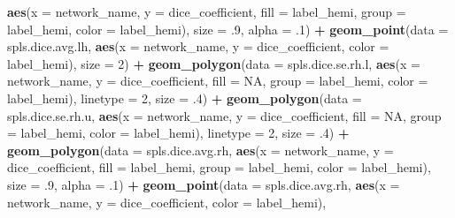 \documentclass[
]{article}
\newenvironment{Shaded}{\begin{snugshade}}{\end{snugshade}}
\newcommand{\DataTypeTok}[1]{\textcolor[rgb]{0.13,0.29,0.53}{#1}}
\newcommand{\DecValTok}[1]{\textcolor[rgb]{0.00,0.00,0.81}{#1}}
\newcommand{\FloatTok}[1]{\textcolor[rgb]{0.00,0.00,0.81}{#1}}
\newcommand{\KeywordTok}[1]{\textcolor[rgb]{0.13,0.29,0.53}{\textbf{#1}}}
\newcommand{\NormalTok}[1]{#1}
\newcommand{\OperatorTok}[1]{\textcolor[rgb]{0.81,0.36,0.00}{\textbf{#1}}}
\newcommand{\OtherTok}[1]{\textcolor[rgb]{0.56,0.35,0.01}{#1}}
\newcommand{\StringTok}[1]{\textcolor[rgb]{0.31,0.60,0.02}{#1}}
\begin{document}
\begin{Shaded}
\begin{Highlighting}[]
{{{{{{{{{{{{               \KeywordTok{aes}\NormalTok{(}\DataTypeTok{x =}\NormalTok{ network_name, }\DataTypeTok{y =}\NormalTok{ dice_coefficient, }
                   \DataTypeTok{fill =}\NormalTok{ label_hemi, }\DataTypeTok{group =}\NormalTok{ label_hemi, }\DataTypeTok{color =}\NormalTok{ label_hemi), }
               \DataTypeTok{size =} \FloatTok{.9}\NormalTok{, }\DataTypeTok{alpha =} \FloatTok{.1}\NormalTok{) }\OperatorTok{+}
\StringTok{  }\KeywordTok{geom_point}\NormalTok{(}\DataTypeTok{data =}\NormalTok{ spls.dice.avg.lh, }
             \KeywordTok{aes}\NormalTok{(}\DataTypeTok{x =}\NormalTok{ network_name, }\DataTypeTok{y =}\NormalTok{ dice_coefficient, }\DataTypeTok{color =}\NormalTok{ label_hemi), }
             \DataTypeTok{size =} \DecValTok{2}\NormalTok{) }\OperatorTok{+}\StringTok{ }
\StringTok{  }
\StringTok{  }
\StringTok{  }\KeywordTok{geom_polygon}\NormalTok{(}\DataTypeTok{data =}\NormalTok{ spls.dice.se.rh.l, }
               \KeywordTok{aes}\NormalTok{(}\DataTypeTok{x =}\NormalTok{ network_name, }\DataTypeTok{y =}\NormalTok{ dice_coefficient, }\DataTypeTok{fill =} \OtherTok{NA}\NormalTok{, }\DataTypeTok{group =}\NormalTok{ label_hemi, }\DataTypeTok{color =}\NormalTok{ label_hemi), }
               \DataTypeTok{linetype =} \DecValTok{2}\NormalTok{, }\DataTypeTok{size =} \FloatTok{.4}\NormalTok{) }\OperatorTok{+}\StringTok{ }
\StringTok{  }\KeywordTok{geom_polygon}\NormalTok{(}\DataTypeTok{data =}\NormalTok{ spls.dice.se.rh.u, }
               \KeywordTok{aes}\NormalTok{(}\DataTypeTok{x =}\NormalTok{ network_name, }\DataTypeTok{y =}\NormalTok{ dice_coefficient, }\DataTypeTok{fill =} \OtherTok{NA}\NormalTok{, }\DataTypeTok{group =}\NormalTok{ label_hemi, }\DataTypeTok{color =}\NormalTok{ label_hemi), }
               \DataTypeTok{linetype =} \DecValTok{2}\NormalTok{, }\DataTypeTok{size =} \FloatTok{.4}\NormalTok{) }\OperatorTok{+}\StringTok{ }
\StringTok{  }\KeywordTok{geom_polygon}\NormalTok{(}\DataTypeTok{data =}\NormalTok{ spls.dice.avg.rh, }
               \KeywordTok{aes}\NormalTok{(}\DataTypeTok{x =}\NormalTok{ network_name, }\DataTypeTok{y =}\NormalTok{ dice_coefficient, }
                   \DataTypeTok{fill =}\NormalTok{ label_hemi, }\DataTypeTok{group =}\NormalTok{ label_hemi, }\DataTypeTok{color =}\NormalTok{ label_hemi), }
               \DataTypeTok{size =} \FloatTok{.9}\NormalTok{, }\DataTypeTok{alpha =} \FloatTok{.1}\NormalTok{) }\OperatorTok{+}
\StringTok{  }\KeywordTok{geom_point}\NormalTok{(}\DataTypeTok{data =}\NormalTok{ spls.dice.avg.rh, }
             \KeywordTok{aes}\NormalTok{(}\DataTypeTok{x =}\NormalTok{ network_name, }\DataTypeTok{y =}\NormalTok{ dice_coefficient, }\DataTypeTok{color =}\NormalTok{ label_hemi), }
}}}}}}}}}}}}
\end{Highlighting}
\end{Shaded}
\end{document}
